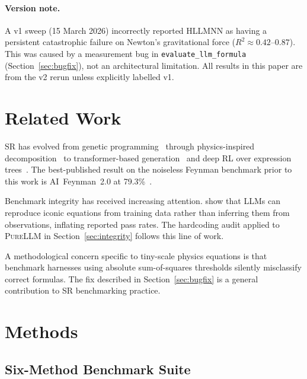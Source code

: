 \documentclass[twoside,11pt]{article}
\newcommand{\PureLLM}{\textsc{PureLLM}}
\newcommand{\HSL}{\textsc{HLLMNN}}
\newcommand{\Rsq}{R^{2}}
\begin{document}
\paragraph{Version note.}
A v1 sweep (15 March 2026) incorrectly reported \HSL{} as having a persistent
catastrophic failure on Newton's gravitational force ($\Rsq \approx 0.42$--$0.87$).
This was caused by a measurement bug in \texttt{evaluate\_llm\_formula}
(Section~\ref{sec:bugfix}), not an architectural limitation.  All results in
this paper are from the v2 rerun unless explicitly labelled v1.

\section{Related Work}
\label{suppb:related}

SR has evolved from genetic programming~\citep{schmidt2009distilling} through
physics-inspired decomposition~\citep{udrescu2020ai} to transformer-based
generation~\citep{biggio2021neural,shojaee2023transformer} and deep RL over
expression trees~\citep{petersen2021deep}.  The best-published result on the
noiseless Feynman benchmark prior to this work is AI~Feynman~2.0 at
79.3\%~\citep{udrescu2020aifeynman2}.

Benchmark integrity has received increasing attention.
\citet{memorization2024audit} show that LLMs can reproduce iconic equations
from training data rather than inferring them from observations, inflating
reported pass rates.  The hardcoding audit applied to \PureLLM{} in
Section~\ref{sec:integrity} follows this line of work.

A methodological concern specific to tiny-scale physics equations is that
benchmark harnesses using absolute sum-of-squares thresholds silently
misclassify correct formulas.  The fix described in Section~\ref{sec:bugfix}
is a general contribution to SR benchmarking practice.

\section{Methods}
\label{sec:methods}

\subsection{Six-Method Benchmark Suite}
\label{sec:methods:sixmethod}
\end{document}
